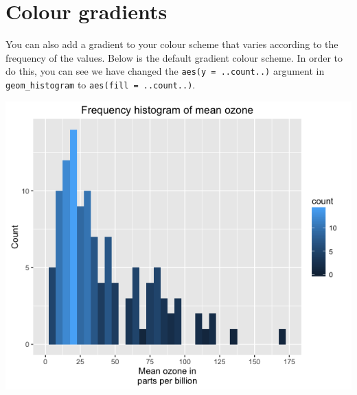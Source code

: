 \section{Colour gradients}\label{colour-gradients}

You can also add a gradient to your colour scheme that varies according
to the frequency of the values. Below is the default gradient colour
scheme. In order to do this, you can see we have changed the
\texttt{aes(y\ =\ ..count..)} argument in \texttt{geom\_histogram} to
\texttt{aes(fill\ =\ ..count..)}.

\begin{Shaded}
\begin{Highlighting}[]
\StringTok{ }\NormalTok{(} \StringTok{ }
\StringTok{      }\NormalTok{(}\NormalTok{(}  \NormalTok{) +}
\StringTok{      }\NormalTok{(} \NormalTok{,}
\StringTok{        } \NormalTok{(}\NormalTok{, }\NormalTok{, }\NormalTok{),}
\StringTok{        }\NormalTok{(}\NormalTok{, }\NormalTok{)) +}
\StringTok{      }\NormalTok{(} \NormalTok{) +}
\StringTok{      }\NormalTok{(}\NormalTok{)}
\end{Highlighting}
\end{Shaded}

\begin{center}\includegraphics[width=0.55\linewidth]{0_all_posts_pdf/histogram_11-1} \end{center}


